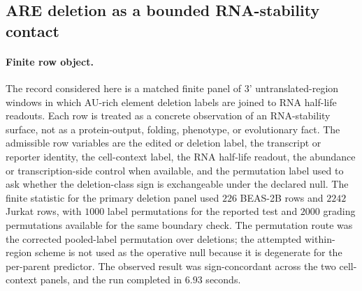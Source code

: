 
\subsection{ARE deletion as a bounded RNA-stability contact}
\label{sec:bioreality-are-deletion-mrna-stability-boundary}

\paragraph{Finite row object.}
The record considered here is a matched finite panel of 3' untranslated-region windows in which AU-rich element deletion labels are joined to RNA half-life readouts.  Each row is treated as a concrete observation of an RNA-stability surface, not as a protein-output, folding, phenotype, or evolutionary fact.  The admissible row variables are the edited or deletion label, the transcript or reporter identity, the cell-context label, the RNA half-life readout, the abundance or transcription-side control when available, and the permutation label used to ask whether the deletion-class sign is exchangeable under the declared null.  The finite statistic for the primary deletion panel used $226$ BEAS-2B rows and $2242$ Jurkat rows, with $1000$ label permutations for the reported test and $2000$ grading permutations available for the same boundary check.  The permutation route was the corrected pooled-label permutation over deletions; the attempted within-region scheme is not used as the operative null because it is degenerate for the per-parent predictor.  The observed result was sign-concordant across the two cell-context panels, and the run completed in $6.93$ seconds.

